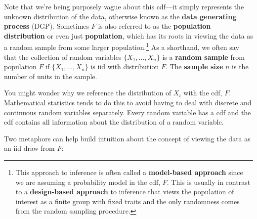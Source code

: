 \documentclass[
  letterpaper,
  DIV=11,
  numbers=noendperiod]{scrreprt}
\theoremstyle{definition}
\theoremstyle{plain}
\theoremstyle{definition}
\theoremstyle{remark}
\begin{document}
Note that we're being purposely vague about this cdf---it simply
represents the unknown distribution of the data, otherwise known as the
\textbf{data generating process} (DGP). Sometimes \(F\) is also referred
to as the \textbf{population distribution} or even just
\textbf{population}, which has its roots in viewing the data as a random
sample from some larger population.\footnote{This approach to inference
  is often called a \textbf{model-based approach} since we are assuming
  a probability model in the cdf, \(F\). This is usually in contrast to
  a \textbf{design-based approach} to inference that views the
  population of interest as a finite group with fixed traits and the
  only randomness comes from the random sampling procedure.} As a
shorthand, we often say that the collection of random variables
\(\{X_1, \ldots, X_n\}\) is a \textbf{random sample} from population
\(F\) if \(\{X_1, \ldots, X_n\}\) is iid with distribution \(F\). The
\textbf{sample size} \(n\) is the number of units in the sample.

\begin{tcolorbox}[enhanced jigsaw, opacitybacktitle=0.6, bottomrule=.15mm, colback=white, colframe=quarto-callout-note-color-frame, arc=.35mm, opacityback=0, breakable, leftrule=.75mm, titlerule=0mm, left=2mm, rightrule=.15mm, toptitle=1mm, bottomtitle=1mm, toprule=.15mm, title=\textcolor{quarto-callout-note-color}{\faInfo}\hspace{0.5em}{Note}, colbacktitle=quarto-callout-note-color!10!white, coltitle=black]

You might wonder why we reference the distribution of \(X_i\) with the
cdf, \(F\). Mathematical statistics tends to do this to avoid having to
deal with discrete and continuous random variables separately. Every
random variable has a cdf and the cdf contains all information about the
distribution of a random variable.

\end{tcolorbox}

Two metaphors can help build intuition about the concept of viewing the
data as an iid draw from \(F\):
\end{document}
